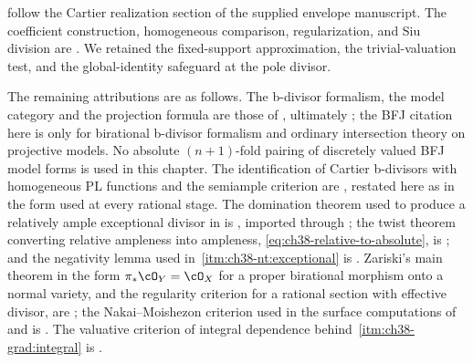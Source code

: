 follow the Cartier realization section of
the supplied envelope manuscript.  The coefficient construction,
homogeneous comparison, regularization, and Siu division are
\cite[Theorem~6.32, Lemma~6.34, Theorem~4.22,
Corollaries~4.23 and~6.17, and Theorem~6.21]{BJ22}.  We retained the
fixed-support approximation, the
trivial-valuation test, and the global-identity safeguard at the pole
divisor.

The remaining attributions are as follows.  The b-divisor formalism, the
model category and the projection formula are those of
, ultimately \cite{BFJ09}; the
BFJ citation here is only for birational b-divisor formalism and ordinary
intersection theory on projective models.  No absolute
$(n+1)$-fold pairing of discretely valued BFJ model forms is used in this
chapter.  The
identification of Cartier b-divisors with homogeneous PL functions and the
semiample criterion are \cite[\S6.4]{BJ22}, restated here as
 in the form used at every rational
stage.  The domination theorem used to produce a relatively ample
exceptional divisor in  is
\cite[\href{https://stacks.math.columbia.edu/tag/081T}{Tag 081T}]{stacks-project},
imported through ; the twist theorem
converting relative ampleness into ampleness,
\eqref{eq:ch38-relative-to-absolute}, is \cite[4.6.13]{EGAII}; and the
negativity lemma used in
\,\cref{itm:ch38-nt:exceptional} is
\cite[Lemma~3.39]{KM08}.  Zariski's main theorem in the form
$\pi_*\cO_Y=\cO_X$ for a proper birational morphism onto a normal
variety, and the regularity criterion for a rational section with effective
divisor, are \cite[Proposition~II.6.3A and Corollary~III.11.4]{Har}; the
Nakai--Moishezon criterion used in the surface computations of
 and
 is \cite[Theorem~1.2.23]{PAG1}.  The
valuative criterion of integral dependence behind
\,\cref{itm:ch38-grad:integral} is
.

